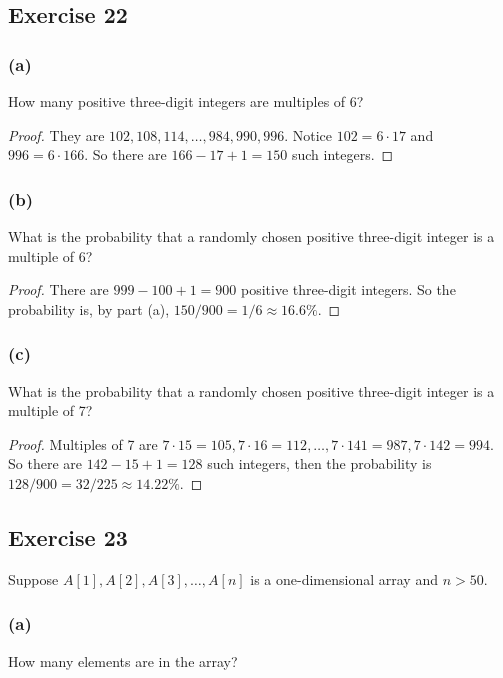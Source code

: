 \documentclass[14pt]{extarticle}
\begin{document}
\subsection{Exercise 22}
\subsubsection{(a)}
How many positive three-digit integers are multiples of 6?

\begin{proof}
They are \(102, 108, 114, \ldots, 984, 990, 996\). Notice \(102 = 6 \cdot 17\) and \(996 = 6 \cdot 166\). So there 
are \(166 - 17 + 1 = 150\) such integers.
\end{proof}

\subsubsection{(b)}
What is the probability that a randomly chosen positive three-digit integer is a multiple of 6?

\begin{proof}
There are \(999 - 100 + 1 = 900\) positive three-digit integers. So the probability is, by part (a), 
\(150/900 = 1/6 \approx 16.6\%\).
\end{proof}

\subsubsection{(c)}
What is the probability that a randomly chosen positive three-digit integer is a multiple of 7?

\begin{proof}
Multiples of 7 are \(7 \cdot 15 = 105, 7 \cdot 16 = 112, \ldots, 7 \cdot 141 = 987, 7 \cdot 142 = 994\). So there
are \(142 - 15 + 1 = 128\) such integers, then the probability is \(128/900 = 32/225 \approx 14.22\%\).
\end{proof}

\subsection{Exercise 23}
Suppose \(A[1], A[2], A[3], \ldots, A[n]\) is a one-dimensional array and \(n > 50\).

\subsubsection{(a)}
How many elements are in the array?
\end{document}
